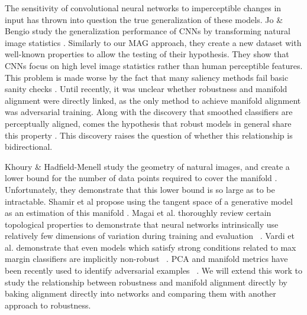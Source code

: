 The sensitivity of convolutional neural networks to imperceptible changes in input has thrown into question the true generalization of these models.
Jo \& Bengio study the generalization performance of CNNs by transforming natural image statistics \cite{jo2017measuring}.  %
Similarly to our MAG approach, they create a new dataset with well-known properties to allow the testing of their hypothesis.
They show that CNNs focus on high level image statistics rather than human perceptible features.
This problem is made worse by the fact that many saliency methods fail basic sanity checks \citep{adebayo2018sanity, kindermans2019reliability}.
Until recently, it was unclear whether robustness and manifold alignment were directly linked, as the only method to achieve manifold alignment was adversarial training.
Along with the discovery that smoothed classifiers are perceptually aligned, comes the hypothesis that robust models in general share this property \cite{kaur2019perceptually}.
This discovery raises the question of whether this relationship is bidirectional.

Khoury \& Hadfield-Menell study the geometry of natural images, and create a lower bound for the number of data points required to cover the manifold \citet{khoury2018}.
Unfortunately, they demonstrate that this lower bound is so large as to be intractable.
Shamir et al propose using the tangent space of a generative model as an estimation of this manifold \cite{shamir2021dimpled}. Magai et al. thoroughly review certain topological properties to demonstrate that neural networks intrinsically use relatively few dimensions of variation during training and evaluation ~\cite{magai2022topology}. Vardi et al. demonstrate that even models which satisfy strong conditions related to max margin classifiers are implicitly non-robust ~\cite{vardi2022gradient}. PCA and manifold metrics have been recently used to identify adversarial examples ~\cite{aparne2022pca, nguyen-minh-luu-2022-textual}. We will extend this work to study the relationship between robustness and manifold alignment directly by baking alignment directly into networks and comparing them with another approach to robustness. 




